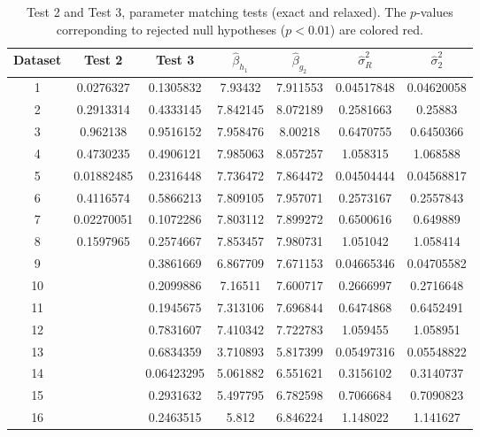 \documentclass[journal,draftcls,onecolumn,12pt,twoside]{IEEEtran}
\newcommand{\tred}{\color{red}}
\begin{document}
\begin{table}[!t]
    \renewcommand{\arraystretch}{1.3}
    \caption{Test 2 and Test 3, parameter matching tests (exact and relaxed).
    The $p$-values correponding to rejected null hypotheses ($p < 0.01$) are
    colored red.}
    \label{tab:test23}
    \centering
    \begin{tabular}{c|c|ccccc}
      \hline
      Dataset & Test 2 &
      Test 3 & $\hat{\beta}_{h_1}$ & $\hat{\beta}_{g_2}$      
      & $\hat{\sigma}_R^2$ & $\hat{\sigma}_2^2$ \\
      \hline
      1 & 0.0276327 & 0.1305832 & 7.93432 & 7.911553 & 0.04517848 & 0.04620058 \\
      2 & 0.2913314 & 0.4333145 & 7.842145 & 8.072189 & 0.2581663 & 0.25883 \\
      3 & 0.962138 & 0.9516152 & 7.958476 & 8.00218 & 0.6470755 & 0.6450366 \\
      4 & 0.4730235 & 0.4906121 & 7.985063 & 8.057257 & 1.058315 & 1.068588 \\
      \hline
      5 & 0.01882485 & 0.2316448 & 7.736472 & 7.864472 & 0.04504444 & 0.04568817 \\
      6 & 0.4116574 & 0.5866213 & 7.809105 & 7.957071 & 0.2573167 & 0.2557843 \\
      7 & 0.02270051 & 0.1072286 & 7.803112 & 7.899272 & 0.6500616 & 0.649889 \\
      8 & 0.1597965 & 0.2574667 & 7.853457 & 7.980731 & 1.051042 & 1.058414 \\
      \hline
      9 & \tred{0} & 0.3861669 & 6.867709 & 7.671153 & 0.04665346 & 0.04705582 \\
      10 & \tred{0} & 0.2099886 & 7.16511 & 7.600717 & 0.2666997 & 0.2716648 \\
      11 & \tred{0} & 0.1945675 & 7.313106 & 7.696844 & 0.6474868 & 0.6452491 \\
      12 & \tred{2.95e-11} & 0.7831607 & 7.410342 & 7.722783 & 1.059455 & 1.058951
      \\
      \hline
      13 & \tred{0} & 0.6834359 & 3.710893 & 5.817399 & 0.05497316 & 0.05548822
      \\
      14 & \tred{0} & 0.06423295 & 5.061882 & 6.551621 & 0.3156102 & 0.3140737\\
      15 & \tred{0} & 0.2931632 & 5.497795 & 6.782598 & 0.7066684 & 0.7090823 \\
      16 & \tred{0} & 0.2463515 & 5.812 & 6.846224 & 1.148022 & 1.141627 \\
      \hline
    \end{tabular}
  \end{table}
  
\end{document}
